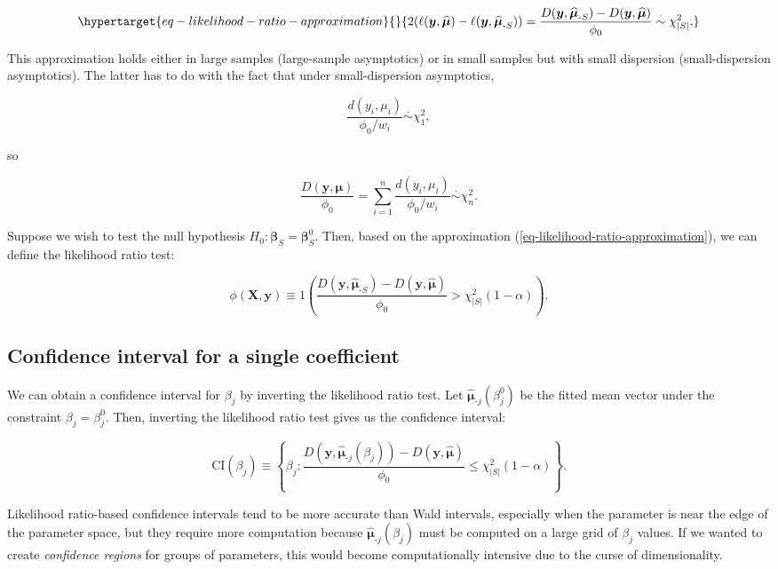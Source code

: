 \documentclass[
  11pt,
  letterpaper,
  oneside]{book}
\theoremstyle{definition}
\theoremstyle{plain}
\theoremstyle{plain}
\theoremstyle{plain}
\theoremstyle{remark}
\begin{document}
\begin{equation}\protect\hypertarget{eq-likelihood-ratio-approximation}{}{
2(\ell(\boldsymbol{y}, \boldsymbol{\widehat{\mu}}) - \ell(\boldsymbol{y}, \boldsymbol{\widehat{\mu}}_{\text{-}S})) = \frac{D(\boldsymbol{y}, \boldsymbol{\widehat{\mu}}_{\text{-}S}) - D(\boldsymbol{y}, \boldsymbol{\widehat{\mu}})}{\phi_0} \overset{\cdot}{\sim} \chi^2_{|S|}.
}\label{eq-likelihood-ratio-approximation}\end{equation}

This approximation holds either in large samples (large-sample
asymptotics) or in small samples but with small dispersion
(small-dispersion asymptotics). The latter has to do with the fact that
under small-dispersion asymptotics,

\[
\frac{d(y_i, \mu_i)}{\phi_0/w_i} \overset{\cdot}{\sim} \chi^2_1,
\]

so

\[
\frac{D(\boldsymbol{y}, \boldsymbol{\mu})}{\phi_0} = \sum_{i = 1}^n \frac{d(y_i, \mu_i)}{\phi_0/w_i} \overset{\cdot}{\sim} \chi^2_n.
\]

Suppose we wish to test the null hypothesis
\(H_0: \boldsymbol{\beta}_S = \boldsymbol{\beta}_S^0\). Then, based on
the approximation (\ref{eq-likelihood-ratio-approximation}), we can
define the likelihood ratio test:

\[
\phi(\boldsymbol{X}, \boldsymbol{y}) \equiv 1\left(\frac{D(\boldsymbol{y}, \boldsymbol{\widehat{\mu}}_{\text{-}S}) - D(\boldsymbol{y}, \boldsymbol{\widehat{\mu}})}{\phi_0} > \chi^2_{|S|}(1-\alpha)\right).
\]

\hypertarget{sec-likelihood-ratio-ci-single-coeff}{%
\subsection{Confidence interval for a single
coefficient}\label{sec-likelihood-ratio-ci-single-coeff}}

We can obtain a confidence interval for \(\beta_j\) by inverting the
likelihood ratio test. Let
\(\boldsymbol{\widehat{\mu}}_{\text{-}j}(\beta_j^0)\) be the fitted mean
vector under the constraint \(\beta_j = \beta_j^0\). Then, inverting the
likelihood ratio test gives us the confidence interval:

\[
\text{CI}(\beta_j) \equiv \left\{\beta_j: \frac{D(\boldsymbol{y}, \boldsymbol{\widehat{\mu}}_{\text{-}j}(\beta_j)) - D(\boldsymbol{y}, \boldsymbol{\widehat{\mu}})}{\phi_0} \leq \chi^2_{|S|}(1-\alpha)\right\}.
\]

Likelihood ratio-based confidence intervals tend to be more accurate
than Wald intervals, especially when the parameter is near the edge of
the parameter space, but they require more computation because
\(\boldsymbol{\widehat{\mu}}_{\text{-}j}(\beta_j)\) must be computed on
a large grid of \(\beta_j\) values. If we wanted to create
\emph{confidence regions} for groups of parameters, this would become
computationally intensive due to the curse of dimensionality.
\end{document}
